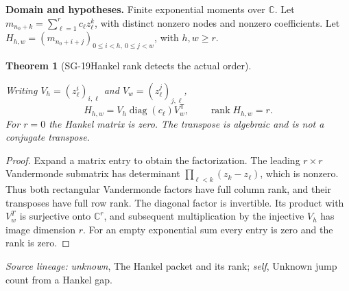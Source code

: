 \documentclass[11pt]{article}
\newtheorem{theorem}{Theorem}[section]
\theoremstyle{definition}\newtheorem{definition}[theorem]{Definition}
\theoremstyle{remark}\newtheorem{remark}[theorem]{Remark}
\begin{document}
\par{\small\textbf{Domain and hypotheses.} Finite exponential moments over $\mathbb C$. Let $m_{n_0+k}=\sum_{\ell=1}^r c_\ell z_\ell^k$, with distinct nonzero nodes and nonzero coefficients. Let $H_{h,w}=(m_{n_0+i+j})_{0\le i<h,\ 0\le j<w}$, with $h,w\ge r$.}\par
\begin{theorem}[SG-19\quad Hankel rank detects the actual order]\label{SG-19}

Writing $V_h=(z_\ell^i)_{i,\ell}$ and $V_w=(z_\ell^j)_{j,\ell}$,
\[
 H_{h,w}=V_h\operatorname{diag}(c_\ell)V_w^{\mathsf T},
 \qquad\operatorname{rank}H_{h,w}=r.
\]
For $r=0$ the Hankel matrix is zero. The transpose is algebraic and is not
a conjugate transpose.

\end{theorem}
\begin{proof}

Expand a matrix entry to obtain the factorization. The leading $r\times r$
Vandermonde submatrix has determinant
$\prod_{\ell<k}(z_k-z_\ell)$, which is nonzero. Thus both rectangular
Vandermonde factors have full column rank, and their transposes have full
row rank. The diagonal factor is invertible. Its product with $V_w^T$ is
surjective onto $\mathbb C^r$, and subsequent multiplication by the injective
$V_h$ has image dimension $r$. For an empty exponential sum every entry is
zero and the rank is zero.

\end{proof}

\par{\small\color{Teal}\textit{Source lineage:} \textit{unknown}, The Hankel packet and its rank; \textit{self}, Unknown jump count from a Hankel gap.}\par
\end{document}
